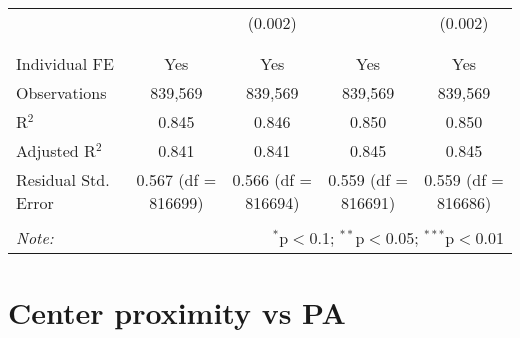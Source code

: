 \documentclass[
]{article}
\begin{document}
\begin{table}[!htbp]
{\begin{tabular}{@{\extracolsep{5pt}}lcccc}
  &  & (0.002) &  & (0.002) \\ 
  & & & & \\ 
\hline \\[-1.8ex] 
Individual FE & Yes & Yes & Yes & Yes \\ 
Observations & 839,569 & 839,569 & 839,569 & 839,569 \\ 
R$^{2}$ & 0.845 & 0.846 & 0.850 & 0.850 \\ 
Adjusted R$^{2}$ & 0.841 & 0.841 & 0.845 & 0.845 \\ 
Residual Std. Error & 0.567 (df = 816699) & 0.566 (df = 816694) & 0.559 (df = 816691) & 0.559 (df = 816686) \\ 
\hline 
\hline \\[-1.8ex] 
\textit{Note:}  & \multicolumn{4}{r}{$^{*}$p$<$0.1; $^{**}$p$<$0.05; $^{***}$p$<$0.01} \\ 
\end{tabular}
} 
\end{table} 
\newpage
\section{Center proximity vs PA}
\end{document}
